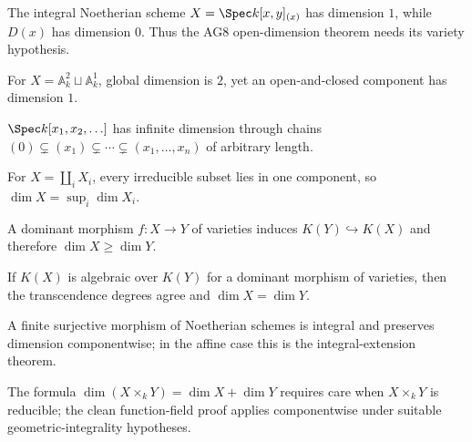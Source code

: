 \begin{example}\label{ex:vi30-adv-01}
The integral Noetherian scheme $X=\Spec k[x,y]_{(x)}$ has dimension $1$, while $D(x)$ has dimension $0$. Thus the AG8 open-dimension theorem needs its variety hypothesis.
\end{example}

\begin{example}\label{ex:vi30-adv-02}
For $X=\mathbb A^2_k\sqcup\mathbb A^1_k$, global dimension is $2$, yet an open-and-closed component has dimension $1$.
\end{example}

\begin{example}\label{ex:vi30-adv-03}
$\Spec k[x_1,x_2,\ldots]$ has infinite dimension through chains $(0)\subsetneq(x_1)\subsetneq\cdots\subsetneq(x_1,\ldots,x_n)$ of arbitrary length.
\end{example}

\begin{example}\label{ex:vi30-adv-04}
For $X=\coprod_i X_i$, every irreducible subset lies in one component, so $\dim X=\sup_i\dim X_i$.
\end{example}

\begin{example}\label{ex:vi30-adv-05}
A dominant morphism $f:X\to Y$ of varieties induces $K(Y)\hookrightarrow K(X)$ and therefore $\dim X\ge\dim Y$.
\end{example}

\begin{example}\label{ex:vi30-adv-06}
If $K(X)$ is algebraic over $K(Y)$ for a dominant morphism of varieties, then the transcendence degrees agree and $\dim X=\dim Y$.
\end{example}

\begin{example}\label{ex:vi30-adv-07}
A finite surjective morphism of Noetherian schemes is integral and preserves dimension componentwise; in the affine case this is the integral-extension theorem.
\end{example}

\begin{example}\label{ex:vi30-adv-08}
The formula $\dim(X\times_kY)=\dim X+\dim Y$ requires care when $X\times_kY$ is reducible; the clean function-field proof applies componentwise under suitable geometric-integrality hypotheses.
\end{example}

